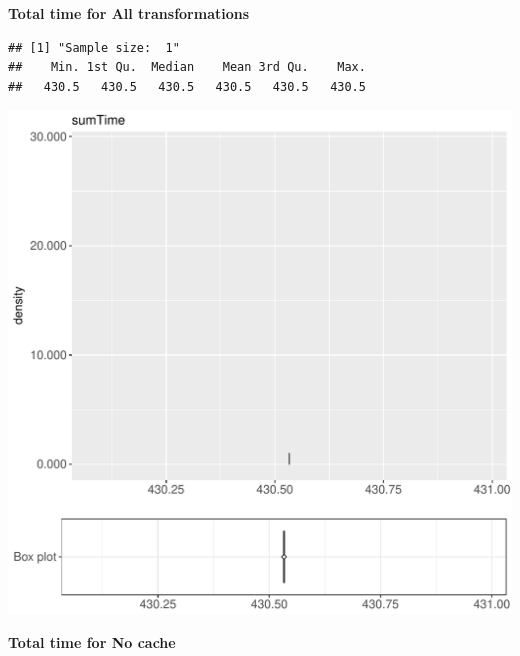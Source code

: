 \documentclass{article}\usepackage[]{graphicx}\usepackage[]{color}
\makeatletter
\def\maxwidth{ %
  \ifdim\Gin@nat@width>\linewidth
    \linewidth
  \else
    \Gin@nat@width
  \fi
}
\newenvironment{kframe}{%
 \def\at@end@of@kframe{}%
 \ifinner\ifhmode%
  \def\at@end@of@kframe{\end{minipage}}%
  \begin{minipage}{\columnwidth}%
 \fi\fi%
 \def\FrameCommand##1{\hskip\@totalleftmargin \hskip-\fboxsep
 \colorbox{shadecolor}{##1}\hskip-\fboxsep
     \hskip-\linewidth \hskip-\@totalleftmargin \hskip\columnwidth}%
 \MakeFramed {\advance\hsize-\width
   \@totalleftmargin\z@ \linewidth\hsize
   \@setminipage}}%
 {\par\unskip\endMakeFramed%
 \at@end@of@kframe}
\newenvironment{knitrout}{}{} %
\makeatother
\begin{document}
 \textbf{Total time for All transformations}
\begin{knitrout}
\color{fgcolor}\begin{kframe}
\begin{verbatim}
## [1] "Sample size:  1"
##    Min. 1st Qu.  Median    Mean 3rd Qu.    Max. 
##   430.5   430.5   430.5   430.5   430.5   430.5
\end{verbatim}


{\ttfamily\noindent\bfseries{}}\end{kframe}
\includegraphics[width=\maxwidth]{figure/RH3_cashew_big-1} 

\end{knitrout}
 \textbf{Total time for No cache}
\end{document}
